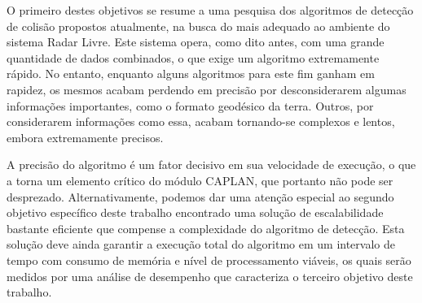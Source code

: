 O primeiro destes objetivos se resume a uma pesquisa dos algoritmos de detecção de colisão propostos atualmente, na busca do mais adequado ao ambiente do sistema Radar Livre. Este sistema opera, como dito antes, com uma grande quantidade de dados combinados, o que exige um algoritmo extremamente rápido. No entanto, enquanto alguns algoritmos para este fim ganham em rapidez, os mesmos acabam perdendo em precisão por desconsiderarem algumas informações importantes, como o formato geodésico da terra. Outros, por considerarem informações como essa, acabam tornando-se complexos e lentos, embora extremamente precisos. 

A precisão do algoritmo é um fator decisivo em sua velocidade de execução, o que a torna um elemento crítico do módulo CAPLAN, que portanto não pode ser desprezado. Alternativamente, podemos dar uma atenção especial ao segundo objetivo específico deste trabalho encontrado uma solução de escalabilidade bastante eficiente que compense a complexidade do algoritmo de detecção. Esta solução deve ainda garantir a execução total do algoritmo em um intervalo de tempo com consumo de memória e nível de processamento viáveis, os quais serão medidos por uma análise de desempenho que caracteriza o terceiro objetivo deste trabalho.






